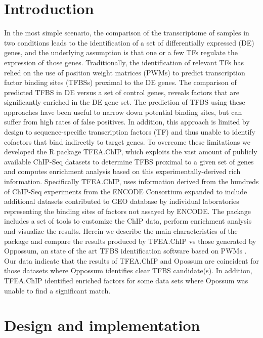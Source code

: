 \documentclass[10pt,letterpaper]{article}
\begin{document}
	\section*{Introduction}
	In the most simple scenario, the comparison of the transcriptome of samples in two conditions leads to the identification of a set of differentially expressed (DE) genes, and the underlying assumption is that one or a few TFs regulate the expression of those genes. Traditionally, the identification of relevant TFs has relied on the use of position weight matrices (PWMs) to predict transcription factor binding sites (TFBSs) proximal to the DE genes\cite{Wasserman}. The comparison of predicted TFBS in DE versus a set of control genes, reveals factors that are significantly enriched in the DE gene set. The prediction of TFBS using these approaches have been useful to narrow down potential binding sites, but can suffer from high rates of false positives. In addition, this approach is limited by design to sequence-specific transcription factors (TF) and thus unable to identify cofactors that bind indirectly to target genes. To overcome these limitations we developed the R package TFEA.ChIP, which exploits the vast amount of publicly available ChIP-Seq datasets to determine TFBS proximal to a given set of genes and computes enrichment analysis based on this experimentally-derived rich information. Specifically TFEA.ChIP, uses information derived from the hundreds of ChIP-Seq experiments from the ENCODE Consortium\cite{ENCODE} expanded to include additional datasets contributed to GEO database\cite{GEO1}\cite{GEO2} by individual laboratories representing the binding sites of factors not assayed by ENCODE. The package includes a set of tools to customize the ChIP data, perform enrichment analysis and visualize the results. Herein we describe the main characteristics of the package and compare the results produced by TFEA.ChIP vs those generated by Oppossum, an state of the art TFBS identification software based on PWMs \cite{Kwon2012}. Our data indicate that the results of TFEA.ChIP and Opossum are coincident for those datasets where Oppossum identifies clear TFBS candidate(s). In addition, TFEA.ChIP identified enriched factors for some data sets where Opossum was unable to find a significant match.
	
	\section*{Design and implementation}
\end{document}
